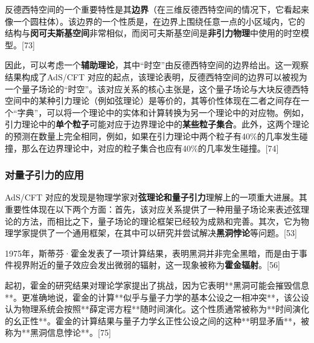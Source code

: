 反德西特空间的一个重要特性是其\textbf{边界}（在三维反德西特空间的情况下，它看起来像一个圆柱体）。该边界的一个性质是，在边界上围绕任意一点的小区域内，它的结构与\textbf{闵可夫斯基空间}非常相似，而闵可夫斯基空间是\textbf{非引力物理}中使用的时空模型。[73]  

因此，可以考虑一个\textbf{辅助理论}，其中“时空”由反德西特空间的边界给出。这一观察结果构成了AdS/CFT 对应的起点，该理论表明，反德西特空间的边界可以被视为一个量子场论的“时空”。该对应关系的核心主张是，这个量子场论与大块反德西特空间中的某种引力理论（例如弦理论）是等价的，其等价性体现在二者之间存在一个“字典”，可以将一个理论中的实体和计算转换为另一个理论中的对应物。例如，引力理论中的\textbf{单个粒子}可能对应于边界理论中的\textbf{某些粒子集合}。此外，这两个理论的预测在数量上完全相同，例如，如果在引力理论中两个粒子有40\%的几率发生碰撞，那么在边界理论中，对应的粒子集合也应有40\%的几率发生碰撞。[74]
\subsubsection{对量子引力的应用}
AdS/CFT 对应的发现是物理学家对\textbf{弦理论和量子引力}理解上的一项重大进展。其重要性体现在以下两个方面：首先，该对应关系提供了一种用量子场论来表述弦理论的方法，而相比之下，量子场论的理论框架已经较为成熟和完善。其次，它为物理学家提供了一个通用框架，在其中可以研究并尝试解决\textbf{黑洞悖论}等问题。[53]

1975年，斯蒂芬·霍金发表了一项计算结果，表明黑洞并非完全黑暗，而是由于事件视界附近的量子效应会发出微弱的辐射，这一现象被称为\textbf{霍金辐射}。[56]  

起初，霍金的研究结果对理论学家提出了挑战，因为它表明**黑洞可能会摧毁信息**。更准确地说，霍金的计算**似乎与量子力学的基本公设之一相冲突**，该公设认为物理系统会按照**薛定谔方程**随时间演化。这个性质通常被称为**时间演化的幺正性**。霍金的计算结果与量子力学幺正性公设之间的这种**明显矛盾**，被称为**黑洞信息悖论**。[75]